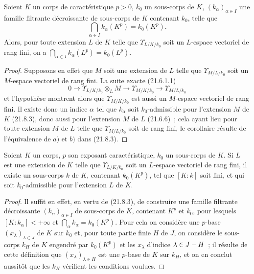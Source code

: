 \begin{corollary}[21.8.5]
\label{0.21.8.5-fr}
Soient $K$ un corps de caractéristique $p>0$, $k_0$ un sous-corps de $K$,
$(k_\alpha)_{\alpha\in I}$ une famille filtrante décroissante de sous-corps
de $K$ contenant $k_0$, telle que
\[
  \bigcap_{\alpha\in I}k_\alpha(K^p)=k_0(K^p).
\]
Alors, pour toute extension $L$ de $K$ telle que $\Upsilon_{L/K/k_0}$ soit
un $L$-espace vectoriel de rang fini, on a $\bigcap_{\alpha\in I}k_\alpha(L^p)=k_0(L^p)$.
\end{corollary}

\begin{proof}
Supposons en effet que $M$ soit une extension de $L$ telle que
$\Upsilon_{M/L/k_0}$ soit un $M$-espace vectoriel de rang fini. La suite
exacte (21.6.1.1)
\[
  0\longrightarrow \Upsilon_{L/K/k_0}\otimes_L M
  \longrightarrow \Upsilon_{M/K/k_0}
  \longrightarrow \Upsilon_{M/L/k_0}
\]
et l'hypothèse montrent alors que $\Upsilon_{M/K/k_0}$ est aussi un
$M$-espace vectoriel de rang fini. Il existe donc un indice $\alpha$ tel que
$k_\alpha$ soit $k_0$-admissible pour l'extension $M$ de $K$ (21.8.3), donc
aussi pour l'extension $M$ de $L$ (21.6.6)~; cela ayant lieu pour toute
extension $M$ de $L$ telle que $\Upsilon_{M/L/k_0}$ soit de rang fini, le
corollaire résulte de l'équivalence de $a)$ et $b)$ dans (21.8.3).
\end{proof}

\begin{corollary}[21.8.6]
\label{0.21.8.6-fr}
Soient $K$ un corps, $p$ son exposant caractéristique, $k_0$ un sous-corps de
$K$. Si $L$ est une extension de $K$ telle que $\Upsilon_{L/K/k_0}$ soit un
$L$-espace vectoriel de rang fini, il existe un sous-corps $k$ de $K$,
contenant $k_0(K^p)$, tel que $[K:k]$ soit fini, et qui soit
$k_0$-admissible pour l'extension $L$ de $K$.
\end{corollary}

\begin{proof}
Il suffit en effet, en vertu de (21.8.3), de construire une famille filtrante
décroissante $(k_\alpha)_{\alpha\in I}$ de sous-corps de $K$, contenant
$K^p$ et $k_0$, pour lesquels $[K:k_\alpha]<+\infty$ et
$\bigcap_\alpha k_\alpha=k_0(K^p)$. Pour cela on considère une $p$-base
$(x_\lambda)_{\lambda\in J}$ de $K$ sur $k_0$ et, pour toute partie finie
$H$ de $J$, on considère le sous-corps $k_H$ de $K$ engendré par $k_0(K^p)$
et les $x_\lambda$ d'indice $\lambda\in J- H$~; il résulte de cette définition
que $(x_\lambda)_{\lambda\in H}$ est une $p$-base de $K$ sur $k_H$, et on en
conclut aussitôt que les $k_H$ vérifient les conditions voulues.
\end{proof}

